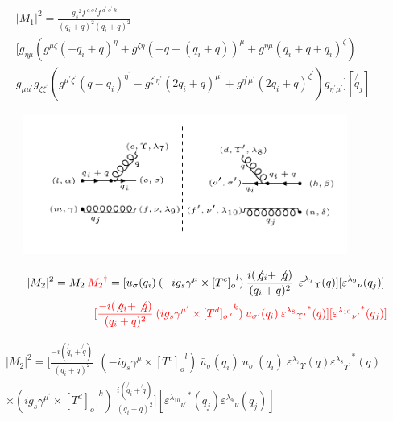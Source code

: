 \begin{equation}
\begin{split}
|M_1|^2=\frac{{g_s}^2 f^{\:a\:o\:l} f^{\:a^{\prime}\:o^{\prime}\:k}}{(q_i +q)^2 (q_i +q)^2}\\
[g_{{\eta}{\mu}}(g^{{\mu}{\zeta}}(-q_i +q)^{\eta}+g^{{\zeta}{\eta}}(-q-(q_i +q))^{\mu}+g^{{\eta}{\mu}}(q_i +q+q_i)^{\zeta})\\
g_{{\mu}{{\mu}^{\prime}}} g_{{\zeta}{{\zeta}^{\prime}}}
(g^{{{\mu}^{\prime}}{{\zeta}^{\prime}}}(q-q_i)^{{\eta}^{\prime}}-g^{{{\zeta}^{\prime}}{{\eta}^{\prime}}}(2q_i +q)^{{\mu}^{\prime}}+g^{{{\eta}^{\prime}}{{\mu}^{\prime}}}(2q_i +q)^{{\zeta}^{\prime}})g_{{{\eta}^{\prime}}{{\mu}^{\prime}}}][\not{q_j}]
\end{split}
\end{equation}
\pagebreak
\begin{figure}[ht!]
\centering
\includegraphics[width=0.95\textwidth]{images/qggM2squer.png}
\end{figure}
\begin{equation}
\begin{split}
|M_2|^2=M_2\:{\color[RGB]{255,0,0} {M_2}^{\dagger}} = [{\bar{u}}_{\sigma}(q_i)\: (-ig_s \gamma^{\mu}\times {[T^c]_o}^l) \: \frac{i(\not{q_i} + \not{q})}{(q_i + q)^2}\:\: {\varepsilon^{\lambda_7}}_{\Upsilon} (q)] [{\varepsilon^{\lambda_9}}_{\nu} (q_j)]\: \\
\quad\quad\quad\quad\quad\quad\quad\quad\:\:{\color[RGB]{255,0,0}[\frac{-i(\not{q_i} + \not{q})}{(q_i + q)^2} \:  (ig_s \gamma^{{\mu}^{\prime}}\times {[T^d]_{o\:^{\prime}}}^k) \: u_{{\sigma}^{\prime}}(q_i) \: {{\varepsilon^{\lambda_8}}_{{\Upsilon}^{\prime}}}^* (q)][{{\varepsilon^{\lambda_{10}}}_{{\nu}^{\prime}}}^* (q_j)]}
\end{split}
\end{equation}

\begin{equation}
\begin{split}
|M_2|^2=[\frac{-i(\not{q_i} + \not{q})}{(q_i + q)^2} \:
 \:  (-ig_s \gamma^{\mu}\times {[T^c]_o}^l) \: {\bar{u}}_{\sigma}(q_i)\:u_{{\sigma}^{\prime}}(q_i) \: {\varepsilon^{\lambda_7}}_{\Upsilon} (q) {{\varepsilon^{\lambda_8}}_{{\Upsilon}^{\prime}}}^* (q) \\
\times (ig_s \gamma^{{\mu}^{\prime}}\times {[T^d]_{o\:^{\prime}}}^k) \: \frac{i(\not{q_i} + \not{q})}{(q_i + q)^2} ]
[{{\varepsilon^{\lambda_{10}}}_{{\nu}^{\prime}}}^* (q_j) {\varepsilon^{\lambda_9}}_{\nu} (q_j)]
\end{split}
\end{equation}

